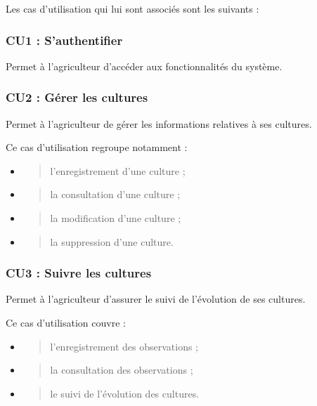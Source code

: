 \documentclass[
]{article}
\begin{document}
Les cas d'utilisation qui lui sont associés sont les suivants :

\hypertarget{cu1-sauthentifier}{%
\subsubsection{CU1 : S'authentifier}\label{cu1-sauthentifier}}

Permet à l'agriculteur d'accéder aux fonctionnalités du système.

\hypertarget{cu2-guxe9rer-les-cultures}{%
\subsubsection{CU2 : Gérer les
cultures}\label{cu2-guxe9rer-les-cultures}}

Permet à l'agriculteur de gérer les informations relatives à ses
cultures.

Ce cas d'utilisation regroupe notamment :

\begin{itemize}
\item
  \begin{quote}
  l'enregistrement d'une culture ;
  \end{quote}
\item
  \begin{quote}
  la consultation d'une culture ;
  \end{quote}
\item
  \begin{quote}
  la modification d'une culture ;
  \end{quote}
\item
  \begin{quote}
  la suppression d'une culture.
  \end{quote}
\end{itemize}

\hypertarget{cu3-suivre-les-cultures}{%
\subsubsection{CU3 : Suivre les
cultures}\label{cu3-suivre-les-cultures}}

Permet à l'agriculteur d'assurer le suivi de l'évolution de ses
cultures.

Ce cas d'utilisation couvre :

\begin{itemize}
\item
  \begin{quote}
  l'enregistrement des observations ;
  \end{quote}
\item
  \begin{quote}
  la consultation des observations ;
  \end{quote}
\item
  \begin{quote}
  le suivi de l'évolution des cultures.
  \end{quote}
\end{itemize}
\end{document}
